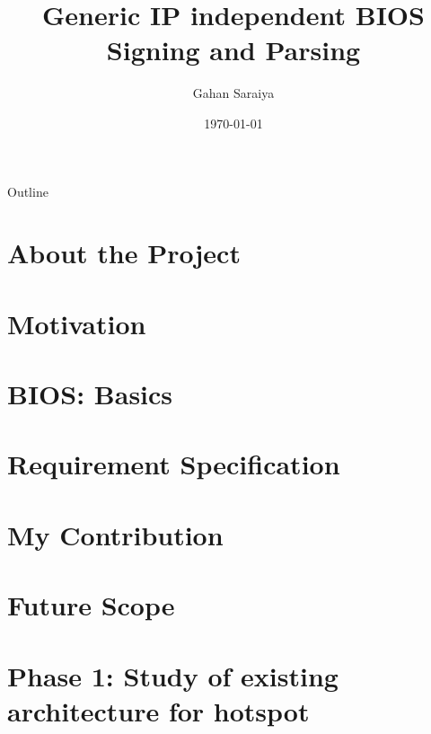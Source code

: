\documentclass{beamer}
\title{Generic IP independent BIOS Signing and Parsing}
\date{\today}
\author[Gahan Saraiya]{Gahan Saraiya}
\institute[18MCEC10]
{
  Institute of Technology\\
  Nirma University
}
\begin{document}
\begin{frame}
\titlepage
\end{frame}


    
\begin{frame}{Outline}
    \tableofcontents
\end{frame}

\section{About the Project}


\section{Motivation}


\section{BIOS: Basics}
% 


\section{Requirement Specification}


\section{My Contribution}


\section{Future Scope}


\section{Phase 1: Study of existing architecture for hotspot}

\end{document}
